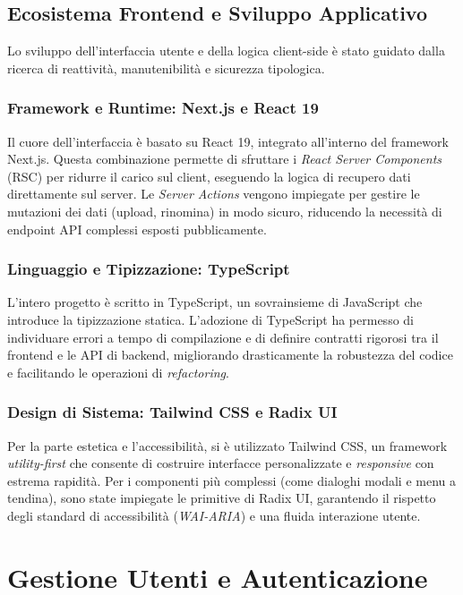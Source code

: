 \documentclass[12pt,a4paper]{report}
\begin{document}
\newpage
\section{Ecosistema Frontend e Sviluppo Applicativo}
Lo sviluppo dell'interfaccia utente e della logica client-side è stato guidato
dalla ricerca di reattività, manutenibilità e sicurezza tipologica.

\subsection{Framework e Runtime: Next.js e React 19}
Il cuore dell'interfaccia è basato su React 19, integrato all'interno del
framework Next.js. Questa combinazione permette di sfruttare i \textit{React
Server Components} (RSC) per ridurre il carico sul client, eseguendo la logica
di recupero dati direttamente sul server. Le \textit{Server Actions} vengono
impiegate per gestire le mutazioni dei dati (upload, rinomina) in modo sicuro,
riducendo la necessità di endpoint API complessi esposti pubblicamente.

\subsection{Linguaggio e Tipizzazione: TypeScript}
L'intero progetto è scritto in TypeScript, un sovrainsieme di JavaScript che
introduce la tipizzazione statica. L'adozione di TypeScript ha permesso di
individuare errori a tempo di compilazione e di definire contratti rigorosi tra
il frontend e le API di backend, migliorando drasticamente la robustezza del
codice e facilitando le operazioni di \textit{refactoring}.

\subsection{Design di Sistema: Tailwind CSS e Radix UI}
Per la parte estetica e l'accessibilità, si è utilizzato Tailwind CSS, un
framework \textit{utility-first} che consente di costruire interfacce
personalizzate e \textit{responsive} con estrema rapidità. Per i componenti più
complessi (come dialoghi modali e menu a tendina), sono state impiegate le
primitive di Radix UI, garantendo il rispetto degli standard di accessibilità
(\textit{WAI-ARIA}) e una fluida interazione utente.

\chapter{Gestione Utenti e Autenticazione}
\label{cap:autenticazione}
\end{document}
